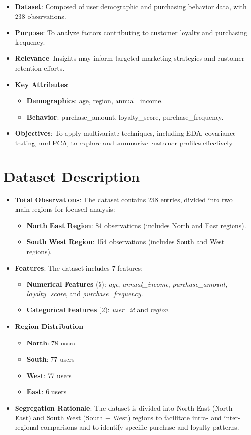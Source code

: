 \documentclass[11pt]{article}
\begin{document}
\begin{itemize}
    \item \textbf{Dataset}: Composed of user demographic and purchasing behavior data, with 238 observations.
    \item \textbf{Purpose}: To analyze factors contributing to customer loyalty and purchasing frequency.
    \item \textbf{Relevance}: Insights may inform targeted marketing strategies and customer retention efforts.
    \item \textbf{Key Attributes}: 
    \begin{itemize}
        \item \textbf{Demographics}: age, region, annual\_income.
        \item \textbf{Behavior}: purchase\_amount, loyalty\_score, purchase\_frequency.
    \end{itemize}
    \item \textbf{Objectives}: To apply multivariate techniques, including EDA, covariance testing, and PCA, to explore and summarize customer profiles effectively.
\end{itemize}
\section{Dataset Description}
\begin{itemize}
    \item \textbf{Total Observations}: The dataset contains 238 entries, divided into two main regions for focused analysis:
    \begin{itemize}
        \item \textbf{North East Region}: 84 observations (includes North and East regions).
        \item \textbf{South West Region}: 154 observations (includes South and West regions).
    \end{itemize}
    \item \textbf{Features}: The dataset includes 7 features:
    \begin{itemize}
        \item \textbf{Numerical Features} (5): \textit{age}, \textit{annual\_income}, \textit{purchase\_amount}, \textit{loyalty\_score}, and \textit{purchase\_frequency}.
        \item \textbf{Categorical Features} (2): \textit{user\_id} and \textit{region}.
    \end{itemize}
    \item \textbf{Region Distribution}:
    \begin{itemize}
        \item \textbf{North}: 78 users
        \item \textbf{South}: 77 users
        \item \textbf{West}: 77 users
        \item \textbf{East}: 6 users
    \end{itemize}
    \item \textbf{Segregation Rationale}: The dataset is divided into North East (North + East) and South West (South + West) regions to facilitate intra- and inter-regional comparisons and to identify specific purchase and loyalty patterns.
\end{itemize}
\end{document}
